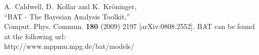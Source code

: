 \documentclass[11pt, a4paper]{article}
\begin{document}

\clearpage 
\pagebreak 

\begin{thebibliography}{99}
  A.~Caldwell, D.~Kollar and K.~Kr{\"o}ninger, \\ 
  ``BAT - The Bayesian Analysis Toolkit,'' \\ 
  Comput. Phys. Commun. {\bf 180} (2009) 2197 [arXiv:0808.2552]. 
  BAT can be found at the following url: \\ http://www.mppmu.mpg.de/bat/models/
\end{thebibliography} 

\end{document}
